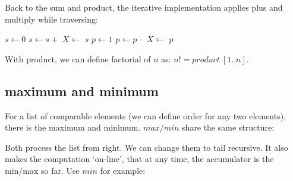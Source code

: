 \documentclass[b5paper]{article}
\begin{document}
Back to the sum and product, the iterative implementation applies plus and multiply while traversing:

\begin{algorithmic}[1]
  \State $s \gets 0$
    \State $s \gets s +$ 
    \State $X \gets$ 
  \EndWhile
  \State \Return $s$
\EndFunction
\Statex
{}
  \State $p \gets 1$
    \State $p \gets p\ \cdot$ 
    \State $X \gets$ 
  \EndWhile
  \State \Return $p$
\EndFunction
\end{algorithmic}

With product, we can define factorial of $n$ as: $n! = product\ [1..n]$.

\subsection{maximum and minimum}
 

For a list of comparable elements (we can define order for any two elements), there is the maximum and minimum. $max/min$ share the same structure:

\be
{}
\ee

Both process the list from right. We can change them to tail recursive. It also makes the computation `on-line', that at any time, the accumulator is the min/max so far. Use $min$ for example:
\end{document}
